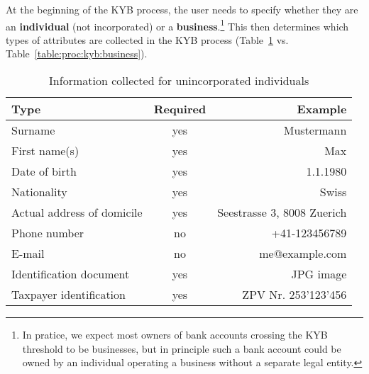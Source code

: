At the beginning of the KYB process, the user needs to specify whether they
are an {\bf individual} (not incorporated) or a {\bf business}.\footnote{ In
pratice, we expect most owners of bank accounts crossing the KYB threshold to
be businesses, but in principle such a bank account could be owned by an
individual operating a business without a separate legal entity.}  This then
determines which types of attributes are collected in the KYB process
(Table~\ref{table:proc:kyb:individual}
vs. Table~\ref{table:proc:kyb:business}).

\begin{table}
  \caption{Information collected for unincorporated individuals}
  \label{table:proc:kyb:individual}
  \begin{center}
    \begin{tabular}{l|c|r}
      {\bf Type}                 & {\bf Required}    & {\bf Example} \\ \hline \hline
      Surname                    & yes        & Mustermann \\
      First name(s)              & yes        & Max \\
      Date of birth              & yes        & 1.1.1980 \\
      Nationality                & yes        & Swiss \\
      Actual address of domicile & yes        & Seestrasse 3, 8008 Zuerich \\
      Phone number               & no         & +41-123456789 \\
      E-mail                     & no         & me@example.com \\
      Identification document    & yes        & JPG image \\
      Taxpayer identification    & yes        & ZPV Nr. 253'123'456 \\
  \end{tabular}
  \end{center}
\end{table}


